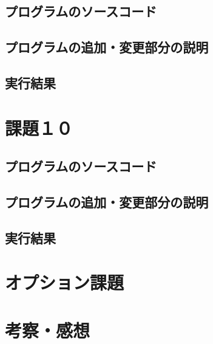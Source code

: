 \documentclass[12pt, xelatex,ja=standard,jafont=hiragino]{bxjsarticle}
\begin{document}
\subsection{プログラムのソースコード}


\subsection{プログラムの追加・変更部分の説明}


\subsection{実行結果}







\section{課題１０}
\subsection{プログラムのソースコード}


\subsection{プログラムの追加・変更部分の説明}


\subsection{実行結果}







\section{オプション課題}




\section{考察・感想}






\end{document}
